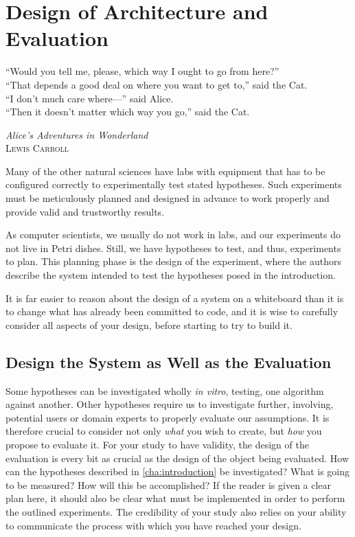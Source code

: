 \chapter{Design of Architecture and Evaluation}
\label{cha:design-and-method}
\epigraph{``Would you tell me, please, which way I ought to go from here?''\\
``That depends a good deal on where you want to get to,'' said the Cat.\\
``I don't much care where—'' said Alice.\\
``Then it doesn't matter which way you go,'' said the Cat.}{\textit{Alice’s Adventures in Wonderland}\\\textsc{Lewis Carroll}}

Many of the other natural sciences have labs with equipment that has to be
configured correctly to experimentally test stated hypotheses.  Such
experiments must be meticulously planned and designed in advance to work
properly and provide valid and trustworthy results.

As computer scientists, we usually do not work in labs, and our experiments
do not live in Petri dishes. Still, we have hypotheses to test, and thus,
experiments to plan. This planning phase is the design of the experiment,
where the authors describe the system intended to test the hypotheses posed
in the introduction.

It is far easier to reason about the design of a system on a whiteboard than
it is to change what has already been committed to code, and it is wise to
carefully consider all aspects of your design, before starting to try to
build it.


\section{Design the System as Well as the Evaluation}
\label{sec:design-system-as}

Some hypotheses can be investigated wholly \emph{in vitro}, testing, \eg one
algorithm against another. Other hypotheses require us to investigate
further, involving, \eg potential users or domain experts to properly
evaluate our assumptions. It is therefore crucial to consider not only
\emph{what} you wish to create, but \emph{how} you propose to evaluate
it. For your study to have validity, the design of the evaluation is every
bit as crucial as the design of the object being evaluated.  How can the
hypotheses described in \autoref{cha:introduction} be investigated?  What is
going to be measured? How will this be accomplished? If the reader is given
a clear plan here, it should also be clear what must be implemented in order
to perform the outlined experiments.  The credibility of your study also
relies on your ability to communicate the process with which you have
reached your design.

